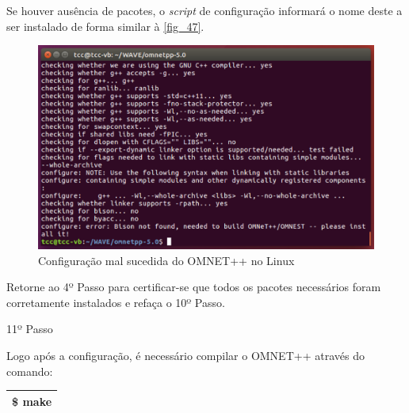 \documentclass[
12pt,				%
openright,			%
oneside,			%
a4paper,			%
brazil,				%
]{abntex2}
\begin{document}
{\begin{anexosenv}
	                \par Se houver ausência de pacotes, o \textit{script} de configuração informará o nome deste a ser instalado de forma similar à \autoref{fig_47}.
		            
	                \begin{figure} [H]
		                \centering
		                \includegraphics[scale=.4]{figuras/aneB/47InstalacaoSemSucessoLinux}
		                \caption{\label{fig_47}Configuração mal sucedida do OMNET++ no Linux}
	                \end{figure}
	                
	                \par Retorne ao 4º Passo para certificar-se que todos os pacotes necessários foram corretamente instalados e refaça o 10º Passo.
                    

                	\begin{description}
		                \item[11º Passo]
		            \end{description}
		            \par Logo após a configuração, é necessário compilar o OMNET++ através do comando:
		
		            \begin{table}[H]
			            \renewcommand{\arraystretch}{1.5}
		                \begin{tabular}{|p{15.5cm}|}
			                \hline
                            \$ make \\
			                \hline
			            \end{tabular}
		            \end{table}
		            

\end{anexosenv}}
\end{document}
